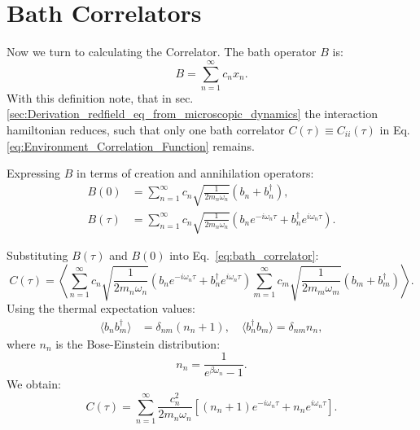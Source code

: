 \section{Bath Correlators}
\label{sec:bath_corr_trans_rates}

Now we turn to calculating the Correlator.
The bath operator \( B \) is:
\begin{equation} \label{eq:bath_operator}
B = \sum_{n=1}^{\infty} c_n x_n.
\end{equation}
With this definition note, that in sec. \ref{sec:Derivation_redfield_eq_from_microscopic_dynamics} the interaction hamiltonian reduces, such that only one bath correlator $C(\tau) \equiv C_{ii}(\tau)$ in Eq. \eqref{eq:Environment_Correlation_Function} remains.

Expressing \( B \) in terms of creation and annihilation operators:
\begin{align}
B(0) &= \sum_{n=1}^{\infty} c_n \sqrt{\frac{1}{2 m_n \omega_n}} (b_n + b_n^\dagger), \label{eq:bath_operator_t0} \\
B(\tau) &= \sum_{n=1}^{\infty} c_n \sqrt{\frac{1}{2 m_n \omega_n}} \left( b_n e^{-i \omega_n \tau} + b_n^\dagger e^{i \omega_n \tau} \right). \label{eq:bath_operator_tau}
\end{align}

Substituting \( B(\tau) \) and \( B(0) \) into Eq.~\eqref{eq:bath_correlator}:
\begin{equation} \label{eq:correlator_substitution}
C(\tau) = \left\langle \sum_{n=1}^{\infty} c_n \sqrt{\frac{1}{2 m_n \omega_n}} (b_n e^{-i \omega_n \tau} + b_n^\dagger e^{i \omega_n \tau}) \sum_{m=1}^{\infty} c_m \sqrt{\frac{1}{2 m_m \omega_m}} (b_m + b_m^\dagger) \right\rangle.
\end{equation}
Using the thermal expectation values:
\begin{align} \label{eq:thermal_expectations}
\langle b_n b_m^\dagger \rangle &= \delta_{nm} (n_n + 1), \quad \langle b_n^\dagger b_m \rangle = \delta_{nm} n_n,
\end{align}
where \( n_n \) is the Bose-Einstein distribution:
\begin{equation} \label{eq:bose_einstein_distribution}
n_n = \frac{1}{e^{\beta \omega_n} - 1}.
\end{equation}
We obtain:
\begin{equation} \label{eq:correlator_result}
C(\tau) = \sum_{n=1}^{\infty} \frac{c_n^2}{2 m_n \omega_n} \left[ (n_n + 1) e^{-i \omega_n \tau} + n_n e^{i \omega_n \tau} \right].
\end{equation}

